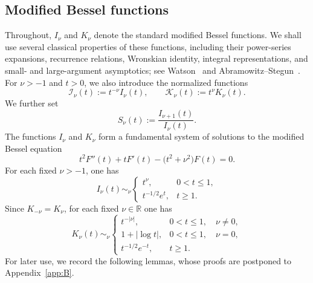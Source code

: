 \documentclass[12pt]{amsart}
\begin{document}













\subsection{Modified Bessel functions}

Throughout, $I_\nu$ and $K_\nu$ denote the standard modified Bessel functions. We shall use several classical properties of these functions, including their power-series expansions, recurrence relations, Wronskian identity, integral representations, and small- and large-argument asymptotics; see Watson~\cite[Chapter~III]{Watson} and Abramowitz--Stegun~\cite[Chapter~9]{AS}. For $\nu>-1$ and $t>0$, we also introduce the normalized functions
\begin{equation*}
    \mathcal I_\nu(t):=t^{-\nu}I_\nu(t),
    \qquad
    \mathcal K_\nu(t):=t^\nu K_\nu(t).
\end{equation*}
We further set
\begin{equation*}
    S_\nu(t):=\frac{I_{\nu+1}(t)}{I_\nu(t)}.
\end{equation*}
The functions $I_\nu$ and $K_\nu$ form a fundamental system of solutions to the modified Bessel equation
\begin{equation*}
    t^2F''(t)+tF'(t)-\bigl(t^2+\nu^2\bigr)F(t)=0.
\end{equation*}
For each fixed $\nu>-1$, one has
\begin{equation*}
    I_\nu(t)\sim_\nu
    \begin{cases}
        t^\nu, & 0<t\leq 1,\\
        t^{-1/2}e^t, & t\geq 1.
    \end{cases}
\end{equation*}
Since $K_{-\nu}=K_\nu$, for each fixed $\nu\in\mathbb R$ one has
\begin{equation*}
    K_\nu(t)\sim_\nu
    \begin{cases}
        t^{-|\nu|}, & 0<t\leq 1,\quad \nu\neq 0,\\
        1+|\log t|, & 0<t\leq 1,\quad \nu=0,\\
        t^{-1/2}e^{-t}, & t\geq 1.
    \end{cases}
\end{equation*}
For later use, we record the following lemmas, whose proofs are postponed to Appendix~\ref{app:B}.
\end{document}
